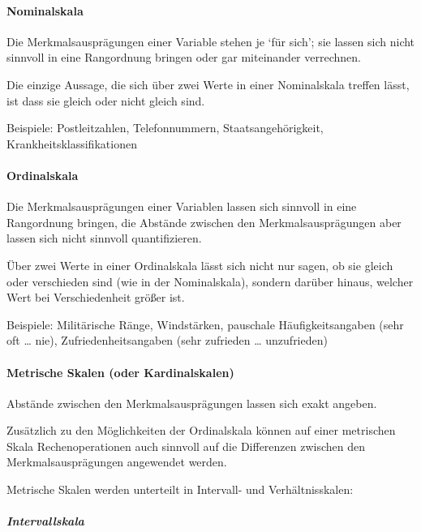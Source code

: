 \documentclass[
  ngerman,
]{article}
\begin{document}
\hypertarget{nominalskala}{%
\paragraph{Nominalskala}\label{nominalskala}}

Die Merkmalsausprägungen einer Variable stehen je `für sich'; sie lassen sich nicht sinnvoll in eine Rangordnung bringen oder gar miteinander verrechnen.

Die einzige Aussage, die sich über zwei Werte in einer Nominalskala treffen lässt, ist dass sie gleich oder nicht gleich sind.

Beispiele: Postleitzahlen, Telefonnummern, Staatsangehörigkeit, Krankheitsklassifikationen

\hypertarget{ordinalskala}{%
\paragraph{Ordinalskala}\label{ordinalskala}}

Die Merkmalsausprägungen einer Variablen lassen sich sinnvoll in eine Rangordnung bringen, die Abstände zwischen den Merkmalsausprägungen aber lassen sich nicht sinnvoll quantifizieren.

Über zwei Werte in einer Ordinalskala lässt sich nicht nur sagen, ob sie gleich oder verschieden sind (wie in der Nominalskala), sondern darüber hinaus, welcher Wert bei Verschiedenheit größer ist.

Beispiele: Militärische Ränge, Windstärken, pauschale Häufigkeitsangaben (sehr oft \ldots{} nie), Zufriedenheitsangaben (sehr zufrieden \ldots{} unzufrieden)

\hypertarget{metrische-skalen-oder-kardinalskalen}{%
\paragraph{Metrische Skalen (oder Kardinalskalen)}\label{metrische-skalen-oder-kardinalskalen}}

Abstände zwischen den Merkmalsausprägungen lassen sich exakt angeben.

Zusätzlich zu den Möglichkeiten der Ordinalskala können auf einer metrischen Skala Rechenoperationen auch sinnvoll auf die Differenzen zwischen den Merkmalsausprägungen angewendet werden.

Metrische Skalen werden unterteilt in Intervall- und Verhältnisskalen:

\hypertarget{intervallskala}{%
\subparagraph{Intervallskala}\label{intervallskala}}
\end{document}
